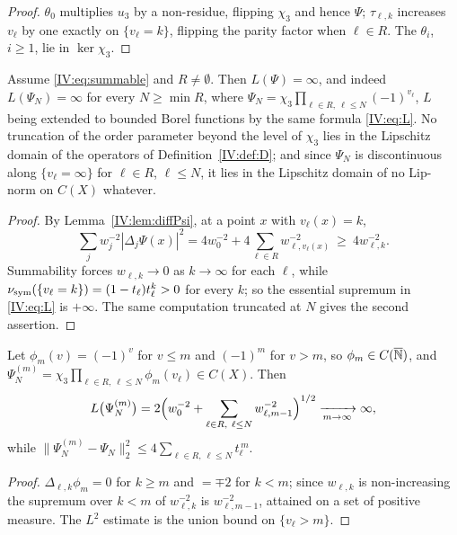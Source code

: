 \begin{proof}
$\theta_0$ multiplies $u_3$ by a non-residue, flipping $\chi_3$ and hence $\Psi$;
$\tau_{\ell,k}$ increases $v_\ell$ by one exactly on $\{v_\ell=k\}$, flipping the parity
factor when $\ell\in R$. The $\theta_i$, $i\ge1$, lie in $\ker\chi_3$.
\end{proof}

\begin{theorem}[Exclusivity]\label{IV:thm:notlip}
Assume \eqref{IV:eq:summable} and $R\ne\emptyset$. Then $L(\Psi)=\infty$, and indeed
$L(\Psi_N)=\infty$ for every $N\ge\min R$, where
$\Psi_N=\chi_3\prod_{\ell\in R,\ \ell\le N}(-1)^{v_\ell}$, $L$ being extended to bounded
Borel functions by the same formula \eqref{IV:eq:L}. No truncation of the order parameter
beyond the level of $\chi_3$ lies in the Lipschitz domain of the operators of
Definition~\ref{IV:def:D}; and since $\Psi_N$ is discontinuous along $\{v_\ell=\infty\}$ for
$\ell\in R$, $\ell\le N$, it lies in the Lipschitz domain of no Lip-norm on $C(X)$
whatever.
\end{theorem}

\begin{proof}
By Lemma~\ref{IV:lem:diffPsi}, at a point $x$ with $v_\ell(x)=k$,
\[
\sum_jw_j^{-2}|\Delta_j\Psi(x)|^2=4w_0^{-2}+4\sum_{\ell\in R}w_{\ell,v_\ell(x)}^{-2}\ \ge\ 4w_{\ell,k}^{-2}.
\]
Summability forces $w_{\ell,k}\to0$ as $k\to\infty$ for each $\ell$, while
$\nu_{\mathrm{sym}}(\{v_\ell=k\})=(1-t_\ell)t_\ell^k>0$ for every $k$; so the essential supremum in
\eqref{IV:eq:L} is $+\infty$. The same computation truncated at $N$ gives the second assertion.
\end{proof}

\begin{corollary}\label{IV:cor:quant}
Let $\phi_m(v)=(-1)^v$ for $v\le m$ and $(-1)^m$ for $v>m$, so $\phi_m\in C(\overline{\mathbb{N}})$, and
$\Psi^{(m)}_N=\chi_3\prod_{\ell\in R,\ \ell\le N}\phi_m(v_\ell)\in C(X)$. Then
\begin{equation}\label{IV:eq:quant}
L\bigl(\Psi^{(m)}_N\bigr)=2\Bigl(w_0^{-2}+\sum_{\ell\in R,\ \ell\le N}w_{\ell,m-1}^{-2}\Bigr)^{1/2}\xrightarrow[m\to\infty]{}\infty,
\end{equation}
while $\|\Psi^{(m)}_N-\Psi_N\|_2^2\le4\sum_{\ell\in R,\ \ell\le N}t_\ell^{\,m}$.
\end{corollary}

\begin{proof}
$\Delta_{\ell,k}\phi_m=0$ for $k\ge m$ and $=\mp2$ for $k<m$; since $w_{\ell,k}$ is
non-increasing the supremum over $k<m$ of $w_{\ell,k}^{-2}$ is $w_{\ell,m-1}^{-2}$, attained
on a set of positive measure. The $L^2$ estimate is the union bound on $\{v_\ell>m\}$.
\end{proof}

